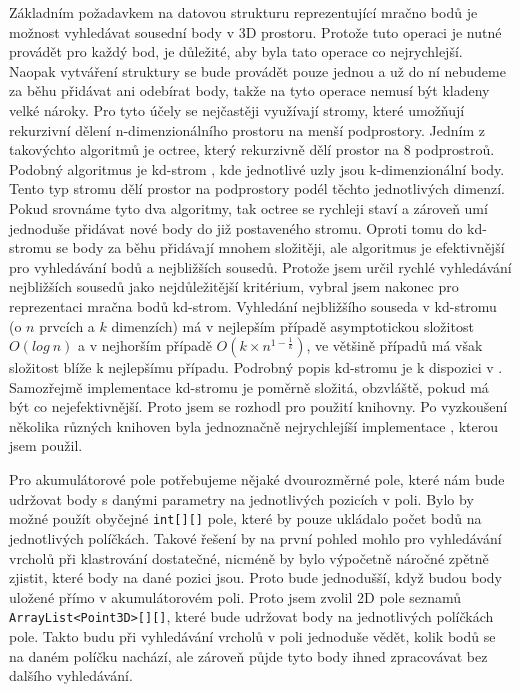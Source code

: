 \documentclass[11pt,twoside,a4paper]{book}
\begin{document}
Základním požadavkem na datovou strukturu reprezentující mračno bodů je možnost vyhledávat sousední body v 3D prostoru. Protože tuto operaci je nutné provádět pro každý bod, je důležité, aby byla tato operace co nejrychlejší. Naopak vytváření struktury se bude provádět pouze jednou a už do ní nebudeme za běhu přidávat ani odebírat body, takže na tyto operace nemusí být kladeny velké nároky. Pro tyto účely se nejčastěji využívají stromy, které umožňují rekurzivní dělení n-dimenzionálního prostoru na menší podprostory. Jedním z takovýchto algoritmů je octree, který rekurzivně dělí prostor na 8 podprostroů. Podobný algoritmus je kd-strom \cite{wiki:kdtree}, kde jednotlivé uzly jsou k-dimenzionální body. Tento typ stromu dělí prostor na podprostory podél těchto jednotlivých dimenzí. Pokud srovnáme tyto dva algoritmy, tak octree se rychleji staví a zároveň umí jednoduše přidávat nové body do již postaveného stromu. Oproti tomu do kd-stromu se body za běhu přidávají mnohem složitěji, ale algoritmus je efektivnější pro vyhledávání bodů a nejbližších sousedů. Protože jsem určil rychlé vyhledávání nejbližších sousedů jako nejdůležitější kritérium, vybral jsem nakonec pro reprezentaci mračna bodů kd-strom. Vyhledání nejbližšího souseda v kd-stromu (o $n$ prvcích a $k$ dimenzích) má v nejlepším případě asymptotickou složitost $O(log~n)$ a v nejhorším případě $O(k \times n^{1-\frac{1}{k}})$, ve většině případů má však složitost blíže k nejlepšímu případu. Podrobný popis kd-stromu je k dispozici v \cite{wiki:kdtree}. Samozřejmě implementace kd-stromu je poměrně složitá, obzvláště, pokud má být co nejefektivnější. Proto jsem se rozhodl pro použití knihovny. Po vyzkoušení několika různých knihoven byla jednoznačně nejrychlejíší implementace \cite{kdtree}, kterou jsem použil.

Pro akumulátorové pole potřebujeme nějaké dvourozměrné pole, které nám bude udržovat body  s danými parametry na jednotlivých pozicích v poli. Bylo by možné použít obyčejné \verb|int[][]| pole, které by pouze ukládalo počet bodů na jednotlivých políčkách. Takové řešení by na první pohled mohlo pro vyhledávání vrcholů při klastrování dostatečné, nicméně by bylo výpočetně náročné zpětně zjistit, které body na dané pozici jsou. Proto bude jednodušší, když budou body uložené přímo v akumulátorovém poli. Proto jsem zvolil 2D pole seznamů \verb|ArrayList<Point3D>[][]|, které bude udržovat body na jednotlivých políčkách pole. Takto budu při vyhledávání vrcholů v poli jednoduše vědět, kolik bodů se na daném políčku nachází, ale zároveň půjde tyto body ihned zpracovávat bez dalšího vyhledávání. 
\end{document}
